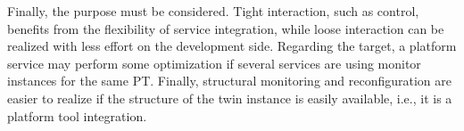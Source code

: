 Finally, the purpose must be considered. Tight interaction, such as control, benefits from the flexibility of service integration, while loose interaction can be realized with less effort on the development side. Regarding the target, a platform service may perform some optimization if several services are using monitor instances for the same PT. Finally, structural monitoring and reconfiguration are easier to realize if the structure of the twin instance is easily available, i.e., it is a platform tool integration.




% 

